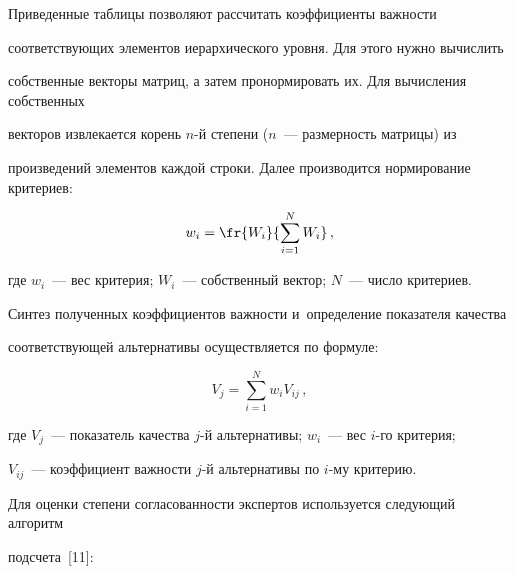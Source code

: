       

      Приведенные таблицы позволяют рассчитать коэффициенты важности 

соответствующих элементов иерархического уровня. Для этого нужно вычислить 

собственные векторы матриц, а затем пронормировать их. Для вычисления собственных 

векторов извлекается корень $n$-й степени ($n$~--- размерность матрицы) из 

произведений элементов каждой строки. Далее производится нормирование критериев:



\noindent

      \begin{equation}

      w_i = \fr{W_i}{\sum\limits_{i=1}^N W_i}\,,

      \label{e1-zo}

      \end{equation}

где $w_i$~--- вес критерия; $W_i$~--- собственный вектор; $N$~--- число критериев.



\pagebreak



 Синтез полученных коэффициентов важности и~определение показателя качества 

соответствующей альтернативы осуществляется по формуле:

      \begin{equation}

      V_j=\sum\limits_{i=1}^N w_i V_{ij}\,,

      \label{e2-zo}

      \end{equation}

где $V_j$~--- показатель качества $j$-й альтернативы; $w_i$~--- вес $i$-го критерия; 

$V_{ij}$~--- коэффициент важности $j$-й альтернативы по $i$-му критерию. 



      Для оценки степени согласованности экспертов используется следующий алгоритм 

подсчета~[11]:



